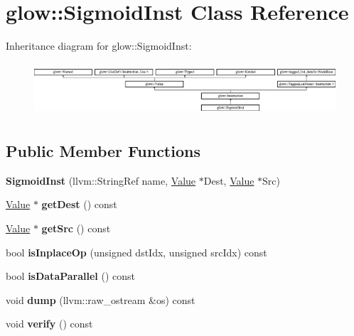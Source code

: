 \hypertarget{classglow_1_1_sigmoid_inst}{}\section{glow\+:\+:Sigmoid\+Inst Class Reference}
\label{classglow_1_1_sigmoid_inst}
Inheritance diagram for glow\+:\+:Sigmoid\+Inst\+:\begin{figure}[H]
\begin{center}
\leavevmode
\includegraphics[height=1.991111cm]{classglow_1_1_sigmoid_inst}
\end{center}
\end{figure}
\subsection*{Public Member Functions}
\begin{DoxyCompactItemize}
\item 
\mbox{\label{classglow_1_1_sigmoid_inst_aed22bcf0b792441eeb8db188156157e0}} 
{\bfseries Sigmoid\+Inst} (llvm\+::\+String\+Ref name, \hyperlink{classglow_1_1_value}{Value} $\ast$Dest, \hyperlink{classglow_1_1_value}{Value} $\ast$Src)
\item 
\mbox{\label{classglow_1_1_sigmoid_inst_a4fce1ab639e49a0012159d270f05f3e5}} 
\hyperlink{classglow_1_1_value}{Value} $\ast$ {\bfseries get\+Dest} () const
\item 
\mbox{\label{classglow_1_1_sigmoid_inst_a20059d5efd416b267cfc813ae9263e0a}} 
\hyperlink{classglow_1_1_value}{Value} $\ast$ {\bfseries get\+Src} () const
\item 
\mbox{\label{classglow_1_1_sigmoid_inst_a79008179169a1a4c4486966db95a6d74}} 
bool {\bfseries is\+Inplace\+Op} (unsigned dst\+Idx, unsigned src\+Idx) const
\item 
\mbox{\label{classglow_1_1_sigmoid_inst_a03e537b7d87e78a11ff6ebeeae1a57f9}} 
bool {\bfseries is\+Data\+Parallel} () const
\item 
\mbox{\label{classglow_1_1_sigmoid_inst_adb707bcc1e6b2417a809f7682f1f9622}} 
void {\bfseries dump} (llvm\+::raw\+\_\+ostream \&os) const
\item 
\mbox{\label{classglow_1_1_sigmoid_inst_a20745ea4a1691c35ecef4b0023ca921e}} 
void {\bfseries verify} () const
\end{DoxyCompactItemize}
